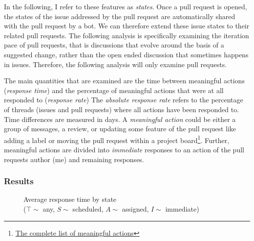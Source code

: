 \documentclass[12pt]{scrartcl}
\begin{document}
In the following, I refer to these features as \textit{states}. Once a pull request is opened, the states of the issue addressed by the pull request are automatically shared with the pull request by a bot. We can therefore extend these issue states to their related pull requests. The following analysis is specifically examining the iteration pace of pull requests, that is discussions that evolve around the basis of a suggested change, rather than the open ended discussion that sometimes happens in issues. Therefore, the following analysis will only examine pull requests.

The main quantities that are examined are the time between meaningful actions (\textit{response time}) and the percentage of meaningful actions that were at all responded to (\textit{response rate}) The \textit{absolute response rate} refers to the percentage of threads (issues and pull requests) where all actions have been responded to. Time differences are measured in days. A \textit{meaningful action} could be either a group of messages, a review, or updating some feature of the pull request like adding a label or moving the pull request within a project board\footnote{\href{https://github.com/jonhue/osp/tree/sources/analysis}{The complete list of meaningful actions}}. Further, meaningful actions are divided into \textit{immediate} responses to an action of the pull requests author (me) and remaining responses.

\subsubsection{Results}

\begin{figure}
    \centering
    \caption{Average response time by state \\ ($\top \sim$ any, $S \sim$ scheduled, $A \sim$ assigned, $I \sim$ immediate)}
    \label{fig:response_time_states}
\end{figure}
\end{document}
